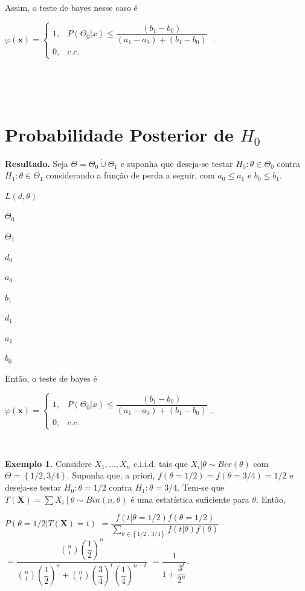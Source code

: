 \documentclass[
]{book}
\begin{document}
Assim, o teste de bayes nesse caso é

\({\varphi}(\boldsymbol x)=\left\{\begin{array}{rl} 1,& P(\Theta_0|x) \leq \dfrac{(b_1-b_0)}{(a_1-a_0)+(b_1-b_0)} \\ 0,& c.c.\end{array}\right.~.\)

\(~\)

\(~\)

\hypertarget{probabilidade-posterior-de-h_0}{%
\section{\texorpdfstring{Probabilidade Posterior de \(H_0\)}{Probabilidade Posterior de H\_0}}\label{probabilidade-posterior-de-h_0}}

\textbf{Resultado.} Seja \(\Theta=\Theta_0 \dot{\cup} \Theta_1\) e suponha que deseja-se testar \(H_0: \theta \in \Theta_0\) contra \(H_1: \theta \in \Theta_1\) considerando a função de perda a seguir, com \(a_0 \leq a_1\) e \(b_0 \leq b_1\).

\(L(d,\theta)\)

\(\Theta_0\)

\(\Theta_1\)

\(d_0\)

\(a_0\)

\(b_1\)

\(d_1\)

\(a_1\)

\(b_0\)

Então, o teste de bayes é

\({\varphi}(\boldsymbol x)=\left\{\begin{array}{rl} 1,& P(\Theta_0|x) \leq \dfrac{(b_1-b_0)}{(a_1-a_0)+(b_1-b_0)} \\ 0,& c.c.\end{array}\right.\).

\(~\)

\textbf{Exemplo 1.} Considere \(X_1,\ldots,X_n\) c.i.i.d. tais que \(X_i|\theta \sim Ber(\theta)\) com \(\Theta = \left\{1/2,3/4\right\}\). Suponha que, a priori, \(f(\theta=1/2)=f(\theta=3/4)=1/2\) e deseja-se testar \(H_0: \theta=1/2\) contra \(H_1: \theta=3/4\). Tem-se que \(T(\boldsymbol X)=\sum X_i~|~\theta\sim Bin(n,\theta)\) é uma estatística suficiente para \(\theta\). Então,

\(P(\theta=1/2|T(\boldsymbol X)=t)\) \(=\dfrac{f(t|\theta=1/2)f(\theta=1/2)}{\displaystyle\sum_{\theta \in \left\{1/2~,~3/4\right\}} f(t|\theta)f(\theta)}\) \(=\dfrac{\displaystyle\binom{n}{t}\left(\dfrac{1}{2}\right)^n}{\displaystyle\binom{n}{t}\left(\dfrac{1}{2}\right)^n+\binom{n}{t}\left(\dfrac{3}{4}\right)^t\left(\dfrac{1}{4}\right)^{n-t}}\) \(=\dfrac{1}{1+\dfrac{3^t}{2^n}}\).
\end{document}
